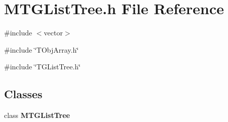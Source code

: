 \section{MTGListTree.h File Reference}
\label{MTGListTree_8h}
{\ttfamily \#include $<$vector$>$}\par
{\ttfamily \#include \char`\"{}TObjArray.h\char`\"{}}\par
{\ttfamily \#include \char`\"{}TGListTree.h\char`\"{}}\par
\subsection*{Classes}
\begin{DoxyCompactItemize}
\item 
class {\bf MTGListTree}
\end{DoxyCompactItemize}
